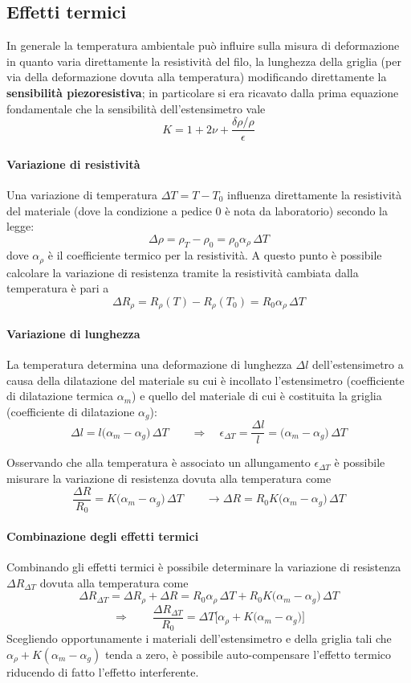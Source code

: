	\subsection{Effetti termici}
		In generale la temperatura ambientale può influire sulla misura di deformazione in quanto varia direttamente la resistività del filo, la lunghezza della griglia (per via della deformazione dovuta alla temperatura) modificando direttamente la \textbf{sensibilità piezoresistiva}; in particolare si era ricavato dalla prima equazione fondamentale che la sensibilità dell'estensimetro vale
		\[ K = 1 + 2\nu + \frac{\delta \rho / \rho}{\epsilon}\]
		
		\paragraph{Variazione di resistività} Una variazione di temperatura $\Delta T = T - T_0$ influenza direttamente la resistività del materiale (dove la condizione a pedice 0 è nota da laboratorio) secondo la legge:
		\[ \Delta \rho = \rho_T - \rho_0 = \rho_0 \alpha_\rho \, \Delta T  \]
		dove $\alpha_\rho$ è il coefficiente termico per la resistività. A questo punto è possibile calcolare la variazione di resistenza tramite la resistività cambiata dalla temperatura è pari a 
		\[ \Delta R_\rho = R_\rho(T) - R_\rho(T_0) = R_0\alpha_\rho \, \Delta T  \]
		
		\paragraph{Variazione di lunghezza} La temperatura determina una deformazione di lunghezza $\Delta l$ dell'estensimetro a causa della dilatazione del materiale su cui è incollato l'estensimetro (coefficiente di dilatazione termica $\alpha_m$) e quello del materiale di cui è costituita la griglia (coefficiente di dilatazione $\alpha_g$):
		\[  \Delta l = l \big(\alpha_m - \alpha_g\big) \, \Delta T \qquad \Rightarrow \quad \epsilon_{\Delta T} = \frac{\Delta l}{l} = \big(\alpha_m-\alpha_g\big) \, \Delta T  \]
		
		Osservando che alla temperatura è associato un allungamento $\epsilon_{\Delta T}$ è possibile misurare la variazione di resistenza dovuta alla temperatura come
		\[ \frac{\Delta R}{R_0} = K \big(\alpha_m-\alpha_g\big)\, \Delta T \qquad \rightarrow \Delta R = R_0 K \big(\alpha_m - \alpha_g\big) \, \Delta T   \]
		
		\paragraph{Combinazione degli effetti termici} Combinando gli effetti termici è possibile determinare la variazione di resistenza $\Delta R_{\Delta T}$ dovuta alla temperatura come
		\[ \Delta R_{\Delta T} = \Delta R_\rho + \Delta R = R_0 \alpha_\rho \, \Delta T + R_0 K \big(\alpha_m - \alpha_g\big) \, \Delta T  \]
		\[ \Rightarrow \qquad \frac{\Delta R_{\Delta T}}{R_0} = \Delta T \Big[ \alpha_\rho + K \big(\alpha_m-\alpha_g\big)\Big]  \]
		Scegliendo opportunamente i materiali dell'estensimetro e della griglia tali che $\alpha_\rho + K(\alpha_m-\alpha_g)$ tenda a zero, è possibile auto-compensare l'effetto termico riducendo di fatto l'effetto interferente.
		
